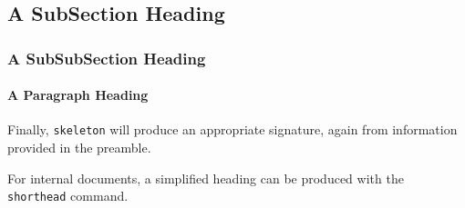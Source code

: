 \documentclass[10pt, oneside]{skeleton}
\begin{document}
	\subsection{A SubSection Heading} %
	\label{sub:a_subsection_heading}
	
	\subsubsection{A SubSubSection Heading} %
	\label{ssub:a_subsubsection_heading}
	
	\paragraph{A Paragraph Heading} %
	\label{par:a_paragraph_heading}
	
	\pa Finally, \texttt{skeleton} will produce an appropriate signature, again from information provided in the preamble. \label{sig}
		
\sign

\shorthead

\pa For internal documents, a simplified heading can be produced with the \texttt{\\shorthead} command.
	
\end{document}
